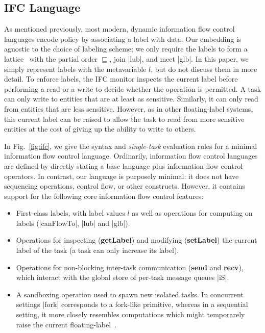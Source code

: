\subsection{IFC Language}

As mentioned previously, most modern, dynamic information flow control
languages encode policy by associating a label with data.  Our
embedding is agnostic to the choice of labeling scheme; we only require
the labels to form a lattice~\cite{Denning:1976:LMS:360051.360056} with
the partial order $\sqsubseteq$, join |lub|, and meet |glb|.  In this
paper, we simply represent labels with the metavariable $l$, but do not
discuss them in more detail.
%
To enforce labels, the IFC monitor inspects the
current label  before performing a read or a write to decide whether the operation is permitted.
%
A task can only write to entities that are at least as sensitive.
%
Similarly, it can only read from entities that are less sensitive.
%
However, as in other floating-label systems, this current label can be raised
to allow the task to read from more sensitive entities at the cost of giving up
the ability to write to others. %

In Fig.~\ref{fig:ifc}, we give the syntax and \emph{single-task}
evaluation rules for a minimal information flow control language.
Ordinarily, information flow control languages are defined by directly
stating a base language plus information flow control operators.  In
contrast, our language is purposely minimal: it does not have sequencing
operations, control flow, or other constructs.  However, it contains
support for the following core information flow control features:

\begin{itemize}
    \item First-class labels, with label values $l$ as well as operations for computing on
labels (|canFlowTo|, |lub| and |glb|).
    \item Operations for inspecting (\textbf{getLabel}) and modifying
    (\textbf{setLabel}) the current label of the task (a task can only increase its label).
    \item Operations for non-blocking inter-task communication (\textbf{send}
    and \textbf{recv}), which interact with the global store of per-task
    message queues |iS|.
    \item A sandboxing operation used to spawn new isolated tasks. In
    concurrent settings |fork| corresponds to a fork-like primitive,
    whereas in a
    sequential setting, it more closely resembles
    computations which might temporarely raise the current
    floating-label~\cite{lio,Hritcu:2013:YIB:2497621.2498098}.

\end{itemize}

